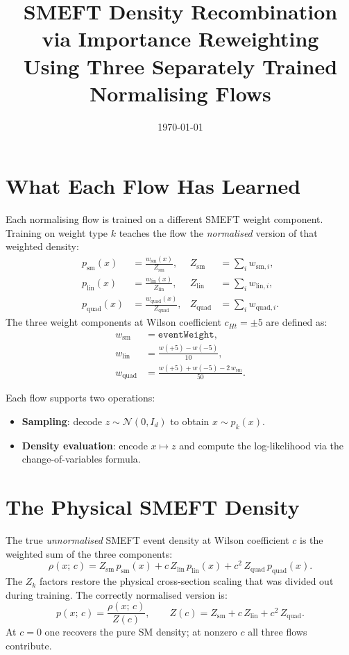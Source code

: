 \documentclass[11pt, a4paper]{article}
\title{SMEFT Density Recombination via Importance Reweighting\\
       \large Using Three Separately Trained Normalising Flows}
\author{}
\date{\today}
\begin{document}
\maketitle

\section{What Each Flow Has Learned}

Each normalising flow is trained on a different SMEFT weight component.
Training on weight type $k$ teaches the flow the \emph{normalised} version
of that weighted density:
\begin{align}
    p_\mathrm{sm}(x)   &= \frac{w_\mathrm{sm}(x)}{Z_\mathrm{sm}},   &
    Z_\mathrm{sm}   &= \sum_i w_{\mathrm{sm},i}, \\[4pt]
    p_\mathrm{lin}(x)  &= \frac{w_\mathrm{lin}(x)}{Z_\mathrm{lin}},  &
    Z_\mathrm{lin}  &= \sum_i w_{\mathrm{lin},i}, \\[4pt]
    p_\mathrm{quad}(x) &= \frac{w_\mathrm{quad}(x)}{Z_\mathrm{quad}},&
    Z_\mathrm{quad} &= \sum_i w_{\mathrm{quad},i}.
\end{align}
The three weight components at Wilson coefficient $c_{Ht} = \pm 5$ are defined as:
\begin{align}
    w_\mathrm{sm}   &= \texttt{eventWeight}, \\
    w_\mathrm{lin}  &= \frac{w(+5) - w(-5)}{10}, \\
    w_\mathrm{quad} &= \frac{w(+5) + w(-5) - 2\,w_\mathrm{sm}}{50}.
\end{align}

Each flow supports two operations:
\begin{itemize}
    \item \textbf{Sampling}: decode $z \sim \mathcal{N}(0, I_d)$ to obtain $x \sim p_k(x)$.
    \item \textbf{Density evaluation}: encode $x \mapsto z$ and compute the
          log-likelihood via the change-of-variables formula.
\end{itemize}

\section{The Physical SMEFT Density}

The true \emph{unnormalised} SMEFT event density at Wilson coefficient $c$ is the
weighted sum of the three components:
\begin{equation}
    \rho(x;\, c) = Z_\mathrm{sm}\, p_\mathrm{sm}(x)
                 + c\, Z_\mathrm{lin}\, p_\mathrm{lin}(x)
                 + c^2\, Z_\mathrm{quad}\, p_\mathrm{quad}(x).
\end{equation}
The $Z_k$ factors restore the physical cross-section scaling that was divided out
during training. The correctly normalised version is:
\begin{equation}
    p(x;\, c) = \frac{\rho(x;\, c)}{Z(c)},
    \qquad
    Z(c) = Z_\mathrm{sm} + c\, Z_\mathrm{lin} + c^2\, Z_\mathrm{quad}.
\end{equation}
At $c = 0$ one recovers the pure SM density; at nonzero $c$ all three flows
contribute.
\end{document}
